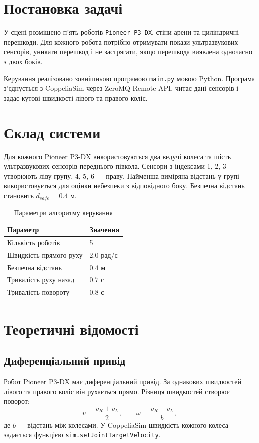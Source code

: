 \documentclass[12pt,a4paper]{article}
\begin{document}
\section{Постановка задачі}

У сцені розміщено п'ять роботів \texttt{Pioneer P3-DX}, стіни арени та
циліндричні перешкоди. Для кожного робота потрібно отримувати покази
ультразвукових сенсорів, уникати перешкод і не застрягати, якщо перешкода
виявлена одночасно з двох боків.

Керування реалізовано зовнішньою програмою \texttt{main.py} мовою Python.
Програма з'єднується з CoppeliaSim через ZeroMQ Remote API, читає дані
сенсорів і задає кутові швидкості лівого та правого коліс.

\section{Склад системи}

Для кожного Pioneer P3-DX використовуються два ведучі колеса та шість
ультразвукових сенсорів переднього півкола. Сенсори з індексами 1, 2, 3
утворюють ліву групу, 4, 5, 6 --- праву. Найменша виміряна відстань у групі
використовується для оцінки небезпеки з відповідного боку. Безпечна
відстань становить $d_{safe}=0.4$ м.

\begin{table}[H]
\centering
\caption{Параметри алгоритму керування}
\begin{tabular}{@{}ll@{}}
\toprule
Параметр & Значення \\
\midrule
Кількість роботів & 5 \\
Швидкість прямого руху & $2.0$ рад/с \\
Безпечна відстань & $0.4$ м \\
Тривалість руху назад & $0.7$ с \\
Тривалість повороту & $0.8$ с \\
\bottomrule
\end{tabular}
\end{table}

\section{Теоретичні відомості}

\subsection{Диференціальний привід}

Робот Pioneer P3-DX має диференціальний привід. За однакових швидкостей
лівого та правого коліс він рухається прямо. Різниця швидкостей створює
поворот:
\[
v=\frac{v_R+v_L}{2}, \qquad
\omega=\frac{v_R-v_L}{b},
\]
де $b$ --- відстань між колесами. У CoppeliaSim швидкість кожного колеса
задається функцією \texttt{sim.setJointTargetVelocity}.
\end{document}
